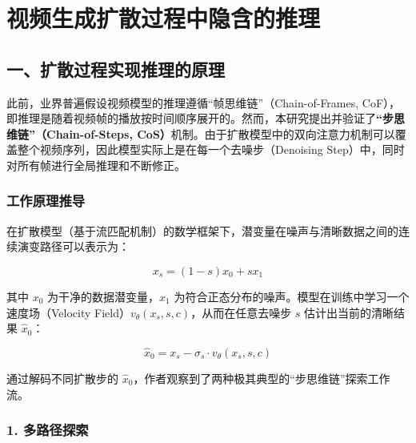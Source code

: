 \setcounter{section}{7}

\hypertarget{ux89c6ux9891ux751fux6210ux6269ux6563ux8fc7ux7a0bux4e2dux9690ux542bux7684ux63a8ux7406}{%
\section{视频生成扩散过程中隐含的推理}\label{ux89c6ux9891ux751fux6210ux6269ux6563ux8fc7ux7a0bux4e2dux9690ux542bux7684ux63a8ux7406}}

\hypertarget{ux4e00ux6269ux6563ux8fc7ux7a0bux5b9eux73b0ux63a8ux7406ux7684ux539fux7406}{%
\subsection{一、扩散过程实现推理的原理}\label{ux4e00ux6269ux6563ux8fc7ux7a0bux5b9eux73b0ux63a8ux7406ux7684ux539fux7406}}

此前，业界普遍假设视频模型的推理遵循``帧思维链''（Chain-of-Frames, CoF），即推理是随着视频帧的播放按时间顺序展开的。然而，本研究提出并验证了\textbf{``步思维链''（Chain-of-Steps, CoS）}机制。由于扩散模型中的双向注意力机制可以覆盖整个视频序列，因此模型实际上是在每一个去噪步（Denoising Step）中，同时对所有帧进行全局推理和不断修正。

\hypertarget{ux5de5ux4f5cux539fux7406ux63a8ux5bfc}{%
\subsubsection{工作原理推导}\label{ux5de5ux4f5cux539fux7406ux63a8ux5bfc}}

在扩散模型（基于流匹配机制）的数学框架下，潜变量在噪声与清晰数据之间的连续演变路径可以表示为：

\[
x_s=(1-s)x_0+s x_1
\]

其中 \(x_0\) 为干净的数据潜变量，\(x_1\) 为符合正态分布的噪声。模型在训练中学习一个速度场（Velocity Field）\(v_\theta(x_s,s,c)\)，从而在任意去噪步 \(s\) 估计出当前的清晰结果 \(\hat{x}_0\)：

\[
\hat{x}_0=x_s-\sigma_s\cdot v_\theta(x_s,s,c)
\]

通过解码不同扩散步的 \(\hat{x}_0\)，作者观察到了两种极其典型的``步思维链''探索工作流。

\hypertarget{ux591aux8defux5f84ux63a2ux7d22}{%
\subsubsection{1. 多路径探索}\label{ux591aux8defux5f84ux63a2ux7d22}}

